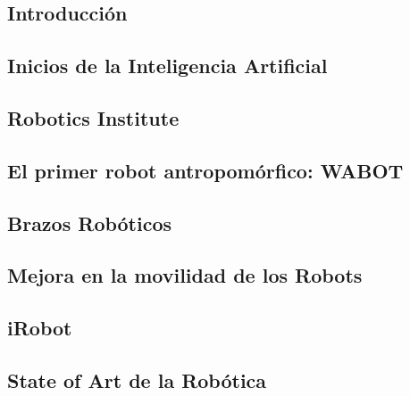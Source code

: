 \documentclass[a4paper,11pt]{article}
\begin{document}
\subsection{Introducción}


\subsection{Inicios de la Inteligencia Artificial}


\subsection{Robotics Institute}


\subsection{El primer robot antropomórfico: WABOT}


\subsection{Brazos Robóticos}


\subsection{Mejora en la movilidad de los Robots}


\subsection{iRobot}


\subsection{State of Art de la Robótica}


\normalsize


\onecolumn


\nocite{*}
\end{document}
